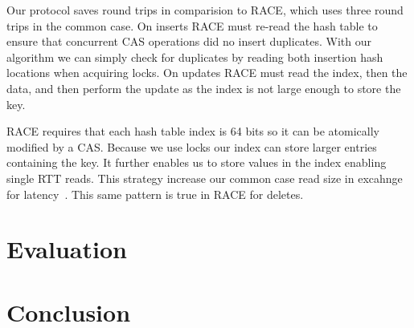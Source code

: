 Our protocol saves round trips in comparision to RACE, which
uses three round trips in the common case. On inserts RACE
must re-read the hash table to ensure that concurrent CAS
operations did no insert duplicates. With our algorithm we
can simply check for duplicates by reading both insertion
hash locations when acquiring locks. On updates RACE must
read the index, then the data, and then perform the update
as the index is not large enough to store the key. 

RACE requires that each hash table index is 64 bits so it
can be atomically modified by a CAS. Because we use locks
our index can store larger entries containing the key. It
further enables us to store values in the index enabling
single RTT reads. This strategy increase our common case
read size in excahnge for latency~.
This same pattern is true in RACE for deletes. 


\section{Evaluation}
\label{sec:eval}

\section{Conclusion}
\label{sec:conclusion}
